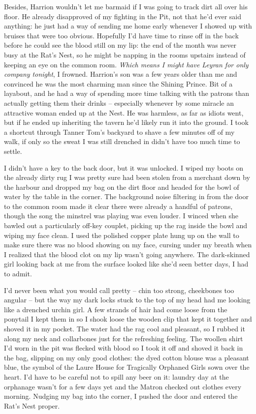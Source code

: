 \documentclass[12pt, openany]{book}
\begin{document}
Besides, Harrion wouldn’t let me barmaid if I was going to track dirt all over his floor. He already disapproved of my fighting in the Pit, not that he’d ever said anything: he just had a way of sending me home early whenever I showed up with bruises that were too obvious. Hopefully I’d have time to rinse off in the back before he could see the blood still on my lip: the end of the month was never busy at the Rat’s Nest, so he might be napping in the rooms upstairs instead of keeping an eye on the common room. \textit{Which means I might have Leyran for only company tonight}, I frowned. Harrion’s son was a few years older than me and convinced he was the most charming man since the Shining Prince. Bit of a layabout, and he had a way of spending more time talking with the patrons than actually getting them their drinks – especially whenever by some miracle an attractive woman ended up at the Nest. He was harmless, as far as idiots went, but if he ended up inheriting the tavern he’d likely run it into the ground. I took a shortcut through Tanner Tom’s backyard to shave a few minutes off of my walk, if only so the sweat I was still drenched in didn’t have too much time to settle.

I didn’t have a key to the back door, but it was unlocked. I wiped my boots on the already dirty rug I was pretty sure had been stolen from a merchant down by the harbour and dropped my bag on the dirt floor and headed for the bowl of water by the table in the corner. The background noise filtering in from the door to the common room made it clear there were already a handful of patrons, though the song the minstrel was playing was even louder. I winced when she bawled out a particularly off-key couplet, picking up the rag inside the bowl and wiping my face clean. I used the polished copper plate hung up on the wall to make sure there was no blood showing on my face, cursing under my breath when I realized that the blood clot on my lip wasn’t going anywhere. The dark-skinned girl looking back at me from the surface looked like she’d seen better days, I had to admit. 

I’d never been what you would call pretty – chin too strong, cheekbones too angular – but the way my dark locks stuck to the top of my head had me looking like a drenched urchin girl. A few strands of hair had come loose from the ponytail I kept them in so I shook loose the wooden clip that kept it together and shoved it in my pocket. The water had the rag cool and pleasant, so I rubbed it along my neck and collarbones just for the refreshing feeling. The woollen shirt I’d worn in the pit was flecked with blood so I took it off and shoved it back in the bag, slipping on my only good clothes: the dyed cotton blouse was a pleasant blue, the symbol of the Laure House for Tragically Orphaned Girls sown over the heart. I’d have to be careful not to spill any beer on it: laundry day at the orphanage wasn’t for a few days yet and the Matron checked out clothes every morning. Nudging my bag into the corner, I pushed the door and entered the Rat’s Nest proper.
\end{document}
